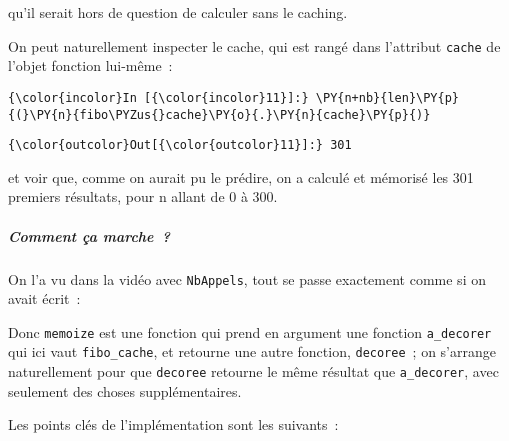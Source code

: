     qu'il serait hors de question de calculer sans le caching.

On peut naturellement inspecter le cache, qui est rangé dans l'attribut
\texttt{cache} de l'objet fonction lui-même~:

    \begin{Verbatim}[commandchars=\\\{\},frame=single,framerule=0.3mm,rulecolor=\color{cellframecolor}]
{\color{incolor}In [{\color{incolor}11}]:} \PY{n+nb}{len}\PY{p}{(}\PY{n}{fibo\PYZus{}cache}\PY{o}{.}\PY{n}{cache}\PY{p}{)}
\end{Verbatim}


\begin{Verbatim}[commandchars=\\\{\},frame=single,framerule=0.3mm,rulecolor=\color{cellframecolor}]
{\color{outcolor}Out[{\color{outcolor}11}]:} 301
\end{Verbatim}
            
    et voir que, comme on aurait pu le prédire, on a calculé et mémorisé les
301 premiers résultats, pour n allant de 0 à 300.

    \hypertarget{comment-uxe7a-marche}{%
\subparagraph{Comment ça marche~?}\label{comment-uxe7a-marche}}

    On l'a vu dans la vidéo avec \texttt{NbAppels}, tout se passe exactement
comme si on avait écrit~:

\begin{Shaded}
\begin{Highlighting}[frame=lines,framerule=0.6mm,rulecolor=\color{asisframecolor}]
    \OperatorTok{<}\OperatorTok{>}

\OperatorTok{=}
\end{Highlighting}
\end{Shaded}

    Donc \texttt{memoize} est une fonction qui prend en argument une
fonction \texttt{a\_decorer} qui ici vaut \texttt{fibo\_cache}, et
retourne une autre fonction, \texttt{decoree}~; on s'arrange
naturellement pour que \texttt{decoree} retourne le même résultat que
\texttt{a\_decorer}, avec seulement des choses supplémentaires.

    Les points clés de l'implémentation sont les suivants~:

